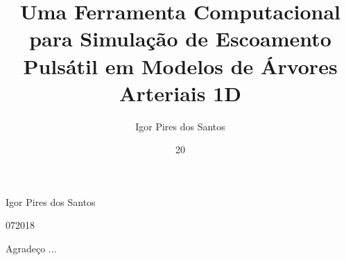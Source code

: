 \newcommand{\mat}[1]{\mbox{\boldmath{$#1$}}}


\newtheorem{mydef}{Definição}[chapter]
\newtheorem{teo}{Teorema}[chapter]

%



{}



%

\title{Uma Ferramenta Computacional para Simulação de Escoamento Pulsátil em Modelos de Árvores Arteriais 1D}
\author{Igor Pires dos Santos}{Igor Pires dos Santos}	



\date{20}{07}{2018}




\inserecapa

\maketitle


\frontmatter

\dedication{Dedico este trabalho primeiramente a Deus, que me possibilitou a vida e consequências dela. A minha família que nunca deixou de me amparar nesse processo evolutivo, minha esposa, e a todos que me acompanharam durante essa caminhada.}

\begin{agradecimentos}
	
	Agradeço ...
\end{agradecimentos}

